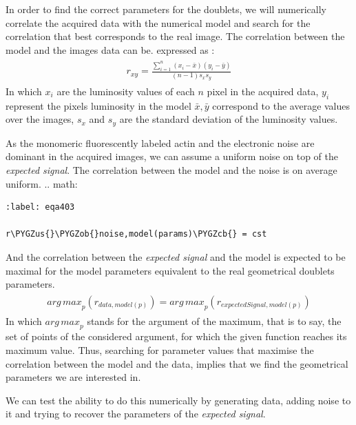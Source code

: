 \documentclass[A4paperpaper,11pt,english]{sphinxmanual}
\def\PYGZus{\char`\_}
\def\PYGZob{\char`\{}
\def\PYGZcb{\char`\}}
\begin{document}
In order to find the correct parameters for the doublets, we will numerically correlate
the acquired data with the numerical model and search for the correlation
that best corresponds to the real image. The correlation between the model and the images
data can be. expressed as :
\label{parts/part4:equation-eqa402}\begin{gather}
\begin{split}r_{xy}=\frac{\sum\limits_{i=1}^n (x_i-\bar{x})(y_i-\bar{y})}{(n-1) s_x s_y}\end{split}\label{parts/part4-eqa402}
\end{gather}
In which \(x_i\) are the luminosity values of each \(n\) pixel in
the acquired data, \(y_i\) represent the pixels luminosity in the model
\(\bar{x},\bar{y}\) correspond to the average values over the images,
\(s_x\) and \(s_y\) are the standard deviation of the luminosity
values.

As the monomeric fluorescently labeled actin and the electronic noise are dominant
in the acquired images, we can assume a uniform noise on top of the \emph{expected signal}. The correlation between the model and the noise is on average
uniform.
.. math:

\begin{Verbatim}[commandchars=\\\{\}]
:label: eqa403

r\PYGZus{}\PYGZob{}noise,model(params)\PYGZcb{} = cst
\end{Verbatim}

And the correlation between the \emph{expected signal} and the model is expected to be
maximal for the model parameters  equivalent to the real geometrical
doublets parameters.
\label{parts/part4:equation-eqa404}\begin{gather}
\begin{split}{arg\,max}_p\left(r_{data,model(p)}\right)= {arg\,max}_p \left(r_{expectedSignal,model(p)}\right)\end{split}\label{parts/part4-eqa404}
\end{gather}
In which \({arg\,max}_p\) stands for the
argument of the maximum, that is to say, the set of points of the considered
argument, for which the given function reaches its maximum value. Thus, searching
for parameter values that maximise the correlation between the model and
the data, implies that we find the geometrical parameters we are interested in.

We can test the ability to do this numerically by generating data, adding noise
to it and trying to recover the parameters of the \emph{expected signal}.
\end{document}
